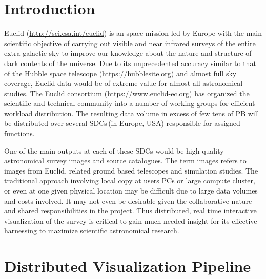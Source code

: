 \documentclass[11pt,twoside]{article}
\begin{document}
\section{Introduction}
Euclid (\url{http://sci.esa.int/euclid}) is an space mission led by Europe with the main scientific objective of carrying out visible and near infrared surveys of the entire extra-galactic sky  to improve our knowledge about the nature and structure  of dark contents of the universe.  Due to its unprecedented accuracy similar to that of the Hubble space telescope (\url{https://hubblesite.org}) and almost full sky coverage,  Euclid data would be of extreme value for almost all astronomical studies.  %
 The Euclid consortium (\url{https://www.euclid-ec.org}) has organized the scientific and technical community into a number of working groups for efficient workload distribution. The resulting data volume in excess of  few tens of PB  \citep{2017IAUS..325...73D} will be distributed over  several SDCs\,(in Europe, USA)  responsible for assigned functions. 

One of the main outputs at each of these SDCs would be high quality astronomical survey images and source catalogues.  The term images refers to  images from Euclid, related ground based telescopes and  simulation studies. The traditional approach involving local copy at users PCs or  large compute cluster, or even at one given physical location may  be difficult due to large data volumes and costs involved. It may not even be desirable given the collaborative nature and shared responsibilities in the project. Thus distributed, real time interactive visualization of the survey is critical to gain much needed insight for its effective harnessing to maximize  scientific astronomical research. 

\section{Distributed Visualization Pipeline}
\label{secn:dvp}
\end{document}
